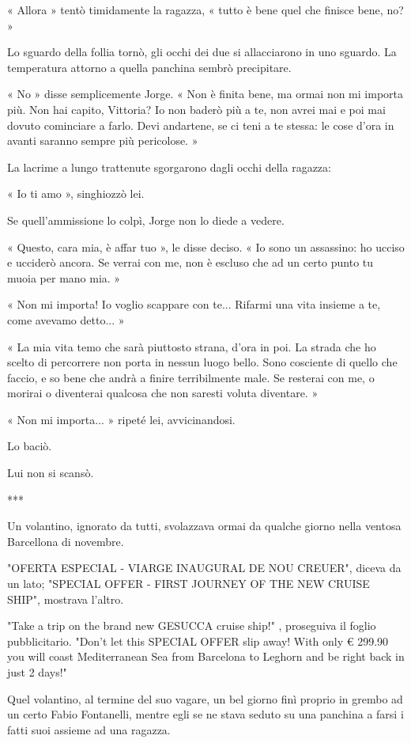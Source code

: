 « Allora » tentò timidamente la ragazza, « tutto è bene quel che finisce bene, no? »

Lo sguardo della follia tornò, gli occhi dei due si allacciarono in uno sguardo. La temperatura attorno a quella panchina sembrò precipitare.

« No » disse semplicemente Jorge. « Non è finita bene, ma ormai non mi importa più. Non hai capito, Vittoria? Io non baderò più a te, non avrei mai e poi mai dovuto cominciare a farlo. Devi andartene, se ci teni a te stessa: le cose d'ora in avanti saranno sempre più pericolose. »

La lacrime a lungo trattenute sgorgarono dagli occhi della ragazza:

« Io ti amo », singhiozzò lei.

Se quell'ammissione lo colpì, Jorge non lo diede a vedere.

« Questo, cara mia, è affar tuo », le disse deciso. « Io sono un assassino: ho ucciso e ucciderò ancora. Se verrai con me, non è escluso che ad un certo punto tu muoia per mano mia. »

« Non mi importa! Io voglio scappare con te... Rifarmi una vita insieme a te, come avevamo detto... »

« La mia vita temo che sarà piuttosto strana, d'ora in poi. La strada che ho scelto di percorrere non porta in nessun luogo bello. Sono cosciente di quello che faccio, e so bene che andrà a finire terribilmente male. Se resterai con me, o morirai o diventerai qualcosa che non saresti voluta diventare. »

« Non mi importa... » ripeté lei, avvicinandosi.

Lo baciò.

Lui non si scansò.

***

Un volantino, ignorato da tutti, svolazzava ormai da qualche giorno nella ventosa Barcellona di novembre.

"OFERTA ESPECIAL - VIARGE INAUGURAL DE NOU CREUER", diceva da un lato; "SPECIAL OFFER - FIRST JOURNEY OF THE NEW CRUISE SHIP", mostrava l'altro.

"Take a trip on the brand new GESUCCA cruise ship!" , proseguiva il foglio pubblicitario. "Don't let this SPECIAL OFFER slip away! With only € 299.90 you will coast Mediterranean Sea from Barcelona to Leghorn and be right back in just 2 days!"

Quel volantino, al termine del suo vagare, un bel giorno finì proprio in grembo ad un certo Fabio Fontanelli, mentre egli se ne stava seduto su una panchina a farsi i fatti suoi assieme ad una ragazza.

